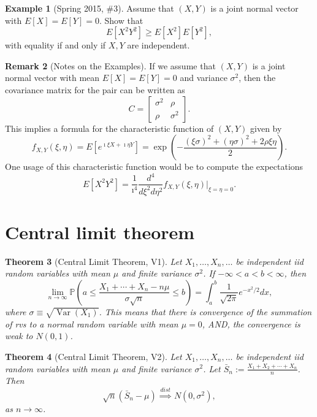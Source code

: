 \documentclass[12pt,reqno]{article}
\renewcommand{\emph}[1]{\textit{#1}}
\theoremstyle{plain}
\newtheorem{theorem}{Theorem}[section]
\theoremstyle{definition}
\newtheorem{example}[theorem]{Example}
\newtheorem{remark}[theorem]{Remark}
\begin{document}
\begin{example}[Spring 2015, \#3]
Assume that $(X, Y)$ is a joint normal vector with $E[X] = E[Y] = 0$. 
Show that 
\[
E[X^2Y^2] \geq E[X^2]E[Y^2], 
\]
with equality if and only if $X,Y$ are independent. 
\end{example}

\begin{remark}[Notes on the Examples] 
If we assume that $(X, Y)$ is a joint normal vector with mean $E[X]=E[Y]=0$ 
and variance $\sigma^2$, then the covariance matrix for the pair can be 
written as 
\[
C = \begin{bmatrix} \sigma^2 & \rho \\ \rho & \sigma^2 \end{bmatrix}. 
\]
This implies a formula for the characteristic function of $(X,Y)$ given by 
\[
f_{X,Y}(\xi,\eta) = E[e^{\imath \xi X + \imath \eta Y}] = 
     \exp\left(-\frac{(\xi \sigma)^2 + (\eta \sigma)^2 + 2 \rho\xi\eta}{2} 
     \right). 
\]
One usage of this characteristic function would be to compute the 
expectations 
\[
E[X^2Y^2] = \frac{1}{\imath^4} \frac{d^4}{d\xi^2 d\eta^2} f_{X,Y}(\xi,\eta) 
     \Biggr\rvert_{\xi=\eta=0}. 
\]
\end{remark} 

\newpage 
\section{Central limit theorem} 

\begin{theorem}[Central Limit Theorem, V1]
Let $X_1,\ldots,X_n,\ldots$ be independent iid random variables with 
mean $\mu$ and finite variance $\sigma^2$. If $-\infty < a < b < \infty$, then 
\[
\lim_{n \rightarrow \infty} \mathbb{P}\left( 
     a \leq \frac{X_1+\cdots+X_n - n\mu}{\sigma\sqrt{n}} \leq b\right) = 
     \int_a^b \frac{1}{\sqrt{2\pi}} e^{-x^2 / 2} dx, 
\]
where $\sigma \equiv \sqrt{\operatorname{Var}(X_1)}$. This means that there is convergence of the 
summation of rvs to a normal random variable with mean $\mu = 0$, AND, the convergence is \emph{weak} to 
$N(0, 1)$. 
\end{theorem} 

\begin{theorem}[Central Limit Theorem, V2]
Let $X_1,\ldots,X_n,\ldots$ be independent iid random variables with 
mean $\mu$ and finite variance $\sigma^2$. 
Let $\bar{S}_n := \frac{X_1 + X_2 + \cdots + X_n}{n}$. 
Then 
\[
\sqrt{n}\left(\bar{S}_n - \mu\right) \overset{dist}{\implies} N(0, \sigma^2), 
\]
as $n \rightarrow \infty$. 
\end{theorem} 
\end{document}
